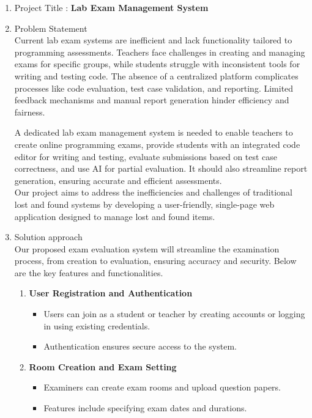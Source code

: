 \documentclass[14pt]{article}
\begin{document}
\begin{enumerate}
\item Project Title : \textbf{Lab Exam Management System}
\item Problem Statement \\
\tabto{.5cm}Current lab exam systems are inefficient and lack functionality tailored to programming assessments. Teachers face challenges in creating and managing exams for specific groups, while students struggle with inconsistent tools for writing and testing code.
The absence of a centralized platform complicates processes like code evaluation, test case validation, and reporting. Limited feedback mechanisms and manual report generation hinder efficiency and fairness.

A dedicated lab exam management system is needed to enable teachers to create online programming exams, provide students with an integrated code editor for writing and testing, evaluate submissions based on test case correctness, and use AI for partial evaluation. It should also streamline report generation, ensuring accurate and efficient assessments.\\
\tabto{.5cm} Our project aims to address the inefficiencies and challenges of traditional lost and found systems by developing a user-friendly, single-page web application designed to manage lost and found items.
\item Solution approach \\
\tabto{.5cm}Our proposed exam evaluation system will streamline the examination process, from creation to evaluation, ensuring accuracy and security. Below are the key features and functionalities.
\begin{enumerate}
\item \textbf{User Registration and Authentication}
\begin{itemize}
\item Users can join as a student or teacher by creating accounts or logging in using existing credentials.
\item Authentication ensures secure access to the system.
\end{itemize}
\item \textbf{Room Creation and Exam Setting}
\begin{itemize}
\item Examiners can create exam rooms and upload question papers.
\item Features include specifying exam dates and durations.
\end{itemize}

\end{enumerate}
\end{enumerate}
\end{document}
